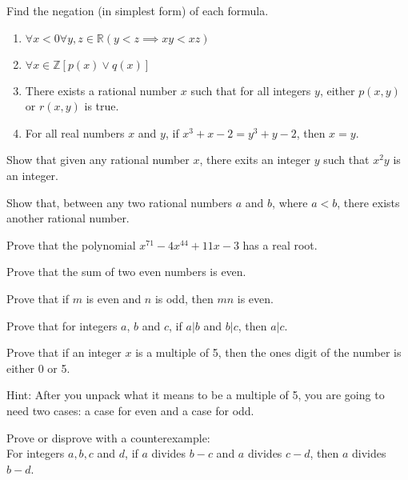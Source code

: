 \documentclass[12pt]{article}
\begin{document}
\begin{qu} Find the negation (in simplest form) of each formula.
\begin{enumerate}[label=\alph*)]
\item $\forall x < 0 \forall y, z \in \mathbb{R} (y < z \implies xy < xz)$
\item $\forall x \in \mathbb{Z} [ p(x) \lor q(x) ]$
\item There exists a rational number $x$ such that for all integers $y$, either $p(x,y)$ or $r(x,y)$ is true.
\item For all real numbers $x$ and $y$, if $x^3 +x -2=y^3+y-2$, then $x=y$.
\end{enumerate}
\end{qu}

\begin{qu}
Show that given any rational number $x$, there exits an integer $y$ such that $x^2y$ is an integer.
\end{qu}

\begin{qu}
Show that, between any two rational numbers $a$ and $b$, where $a<b$, there exists another rational number. \end{qu}

\begin{qu}
Prove that the polynomial $x^{71}-4x^{44}+11x-3$ has a real root.
\end{qu}




\begin{qu}
Prove that the sum of two even numbers is even.
\end{qu}

\begin{qu}
Prove that if $m$ is even and $n$ is odd, then $mn$ is even.
\end{qu}

\begin{qu}
Prove that for integers $a$, $b$ and $c$, if $a|b$ and $b|c$, then $a|c$.
\end{qu}

\begin{qu}
Prove that if an integer $x$ is a multiple of 5, then the ones digit of the number is either 0 or 5.

Hint: After you unpack what it means to be a multiple of 5, you are going to need two cases: a case for even and a case for odd.
\end{qu}


\begin{qu} Prove or disprove with a counterexample:\\
For integers $a, b, c$ and $d$, if $a$ divides $b-c$ and $a$ divides $c-d$, then $a$ divides $b-d$.
\end{qu}
\end{document}
